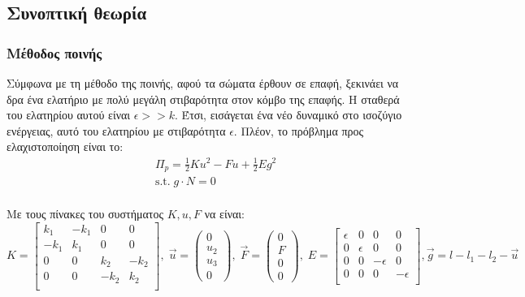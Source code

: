 \documentclass{article}
\begin{document}
\subsection{Συνοπτική θεωρία}
\subsubsection{Μέθοδος ποινής}
Σύμφωνα με τη μέθοδο της ποινής, αφού τα σώματα έρθουν σε επαφή, ξεκινάει να δρα ένα ελατήριο με πολύ μεγάλη στιβαρότητα στον κόμβο της επαφής. Η σταθερά του ελατηρίου αυτού είναι $\epsilon >> k$. Έτσι, εισάγεται ένα νέο δυναμικό στο ισοζύγιο ενέργειας, αυτό του ελατηρίου με στιβαρότητα $\epsilon$. Πλέον, το πρόβλημα προς ελαχιστοποίηση είναι το:
 \begin{align}
    &\Pi_p = \frac{1}{2}Ku^2 - F u + \frac{1}{2}E g ^2\\
    &\text{s.t.}\;  g\cdot N = 0\\
\end{align}

Με τους πίνακες του συστήματος $K, u, F$ να είναι:
\begin{equation}
    K = \begin{bmatrix}
        k_1 &-k_1 & 0 & 0\\
        -k_1 & k_1 & 0 & 0\\
        0 &0 & k_2 & -k_2\\
        0 &0 & -k_2 & k_2\\
    \end{bmatrix},\; \vec{u} = \begin{pmatrix}
        0\\ u_2 \\ u_3\\ 0
    \end{pmatrix},\; \vec{F} = \begin{pmatrix}
        0\\ F\\ 0\\0
    \end{pmatrix}, \; E = \begin{bmatrix}
        \epsilon & 0 & 0 & 0\\
        0 & \epsilon & 0 & 0\\
         0 & 0 & -\epsilon & 0\\
         0 & 0 & 0 & -\epsilon\\
    \end{bmatrix}, \vec{g} = l - l_1 - l_2 - \vec{u}
\end{equation}
\end{document}
